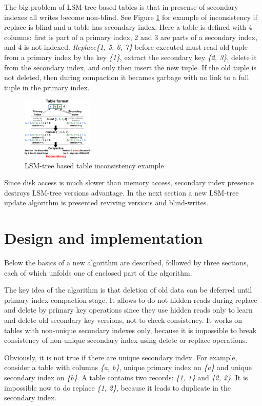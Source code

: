 \documentclass{vldb}
\begin{document}
The big problem of LSM-tree based tables is that in presense of secondary
indexes all writes become non-blind. See Figure \ref{fig:inconsistent_example}
for example of inconsistency if replace is blind and a table has secondary
index. Here a table is defined with 4 columns: first is part of a primary index,
2 and 3 are parts of a secondary index, and 4 is not indexed.
\textit{Replace\{1, 5, 6, 7\}} before executed must read old tuple from a
primary index by the key \textit{\{1\}}, extract the secondary key
\textit{\{2, 3\}}, delete it from the secondary index, and only then insert the
new tuple. If the old tuple is not deleted, then during compaction it becames
garbage with no link to a full tuple in the primary index.
\begin{figure}
\centering
\includegraphics[width=0.3\textwidth]{inconsistent_example}
\caption{LSM-tree based table inconsistency example}
\label{fig:inconsistent_example}
\end{figure}

Since disk access is much slower than memory access, secondary index presence
destroys LSM-tree versions advantage. In the next section a new LSM-tree update
algorithm is presented reviving versions and blind-writes.

\section{Design and implementation}
Below the basics of a new algorithm are described, followed by three sections,
each of which unfolds one of enclosed part of the algorithm.

The key idea of the algorithm is that deletion of old data can be deferred until
primary index compaction stage. It allows to do not hidden reads during replace
and delete by primary key operations since they use hidden reads only to learn
and delete old secondary key versions, not to check consistency. It works on
tables with non-unique secondary indexes only, because it is impossible to break
consistency of non-unique secondary index using delete or replace operations.

Obviously, it is not true if there are unique secondary index. For example,
consider a table with columns \textit{\{a, b\}}, unique primary index on
\textit{\{a\}} and unique secondary index on \textit{\{b\}}. A table contains
two records: \textit{\{1, 1\}} and \textit{\{2, 2\}}. It is impossible now to do
replace \textit{\{1, 2\}}, because it leads to duplicate in the secondary index.
\end{document}

